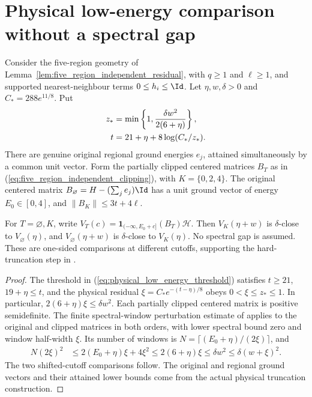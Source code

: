 \section{Physical low-energy comparison without a spectral gap}

\begin{lemma}
    \label{lem:physical_low_energy_closeness}
    \leanok
    Consider the five-region geometry of
    Lemma~\ref{lem:five_region_independent_residual}, with
    $q\ge1$ and $\ell\ge1$, and supported nearest-neighbour terms
    $0\le h_i\le\Id$. Let $\eta,w,\delta>0$ and $C_*=288e^{11/8}$. Put
    \begin{align}
        z_* & =\min\left\{1,\frac{\delta w^2}{2(6+\eta)}\right\},\notag \\
        t   & =21+\eta+8\log(C_*/z_*).
        \label{eq:physical_low_energy_threshold}
    \end{align}
    There are genuine original regional ground energies $e_j$, attained
    simultaneously by a common unit vector. Form the partially clipped
    centered matrices $B_T$ as in
    (\ref{eq:five_region_independent_clipping}), with $K=\{0,2,4\}$.
    The original centered matrix $B_\varnothing=H-(\sum_j e_j)\Id$ has a
    unit ground vector of energy $E_0\in[0,4]$, and
    $\|B_K\|\le3t+4\ell$.

    For $T=\varnothing,K$, write
    $V_T(c)=\mathbf1_{(-\infty,E_0+c]}(B_T)\mathcal H$.
    Then $V_K(\eta+w)$ is $\delta$-close to $V_\varnothing(\eta)$, and
    $V_\varnothing(\eta+w)$ is $\delta$-close to $V_K(\eta)$.
    No spectral gap is assumed. These are one-sided comparisons at
    different cutoffs, supporting the hard-truncation step in
    \cite[Lemma~4.5 and Theorem~4.8]{Arad2016RigorousRG}.
\end{lemma}

\begin{proof}
    \leanok
    The threshold in (\ref{eq:physical_low_energy_threshold}) satisfies
    $t\ge21$, $19+\eta\le t$, and the physical residual
    $\xi=C_*e^{-(t-\eta)/8}$ obeys $0<\xi\le z_*\le1$.
    In particular, $2(6+\eta)\xi\le\delta w^2$.
    Each partially clipped centered matrix is positive semidefinite.
    The finite spectral-window perturbation estimate of
    \cite[``Closeness of the low-energy subspaces'']{QICLean2026Blueprint}
    applies to the original and clipped matrices in both orders, with
    lower spectral bound zero and window half-width $\xi$.
    Its number of windows is
    $N=\lceil(E_0+\eta)/(2\xi)\rceil$, and
    \begin{align*}
        N(2\xi)^2
         & \le2(E_0+\eta)\xi+4\xi^2
        \le2(6+\eta)\xi
        \le\delta w^2
        \le\delta(w+\xi)^2.
    \end{align*}
    The two shifted-cutoff comparisons follow. The original and regional
    ground vectors and their attained lower bounds come from the actual
    physical truncation construction.
\end{proof}
